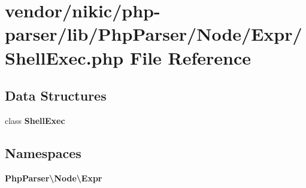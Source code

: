 \section{vendor/nikic/php-\/parser/lib/\+Php\+Parser/\+Node/\+Expr/\+Shell\+Exec.php File Reference}
\label{_shell_exec_8php}
\subsection*{Data Structures}
\begin{DoxyCompactItemize}
\item 
class {\bf Shell\+Exec}
\end{DoxyCompactItemize}
\subsection*{Namespaces}
\begin{DoxyCompactItemize}
\item 
 {\bf Php\+Parser\textbackslash{}\+Node\textbackslash{}\+Expr}
\end{DoxyCompactItemize}
